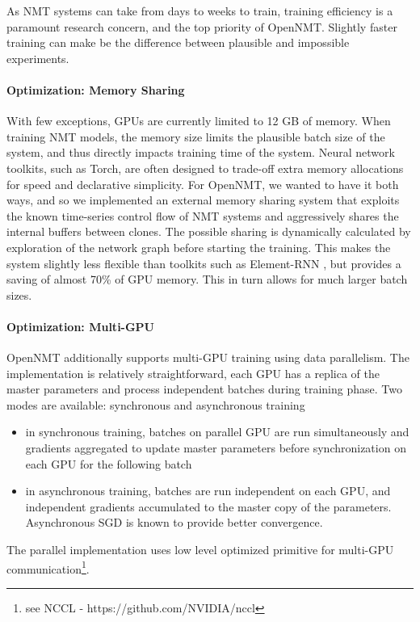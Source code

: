 \documentclass[11pt]{article}
\begin{document}
As NMT systems can take from days to weeks to train, training
efficiency is a paramount research concern, and the top priority of
OpenNMT. Slightly faster training can make be the difference between
plausible and impossible experiments.

\paragraph{Optimization: Memory Sharing}

With few exceptions, GPUs are currently limited to 12 GB of
memory. When training NMT models, the memory size limits the plausible
batch size of the system, and thus directly impacts training time of
the system. Neural network toolkits, such as Torch, are often designed
to trade-off extra memory allocations for speed and declarative
simplicity. For OpenNMT, we wanted to have it both ways, and so we
implemented an external memory sharing system that exploits the known
time-series control flow of NMT systems and aggressively shares the
internal buffers between clones. The possible sharing is dynamically calculated
by exploration of the network graph before starting the training. 
This makes the system slightly less flexible than
toolkits such as Element-RNN \cite{DBLP:journals/corr/LeonardWW15ss},
but provides a saving of almost 70\% of GPU memory. This in turn
allows for much larger batch sizes.

\paragraph{Optimization: Multi-GPU} OpenNMT additionally supports multi-GPU
training using data parallelism. The implementation is relatively straightforward, each GPU
 has a replica of the master parameters and process independent batches during training phase.
Two modes are available: synchronous and asynchronous training
\begin{itemize}
\item in synchronous training, batches on parallel GPU are run simultaneously and gradients 
aggregated to update master parameters before synchronization on each GPU for the following batch
\item in asynchronous training, batches are run independent on each GPU, and independent gradients accumulated 
to the master copy of the parameters. Asynchronous SGD is known to provide better convergence.
\end{itemize}
The parallel implementation uses low level optimized primitive for multi-GPU communication\footnote{see NCCL - https://github.com/NVIDIA/nccl}.
\end{document}
